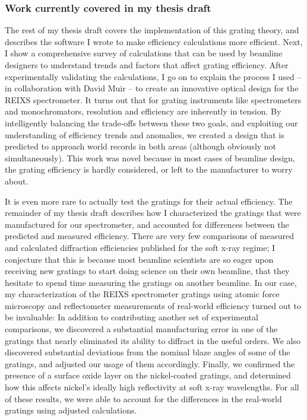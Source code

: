 \documentclass[singlespace,proposal]{uofsthesis-cs}
\begin{document}
\subsubsection{Work currently covered in my thesis draft}
The rest of my thesis draft covers the implementation of this grating theory, and describes the software I wrote to make efficiency calculations more efficient.  Next, I show a comprehensive survey of calculations that can be used by beamline designers to understand trends and factors that affect grating efficiency.  After experimentally validating the calculations, I go on to explain the process I used -- in collaboration with David Muir -- to create an innovative optical design for the REIXS spectrometer.  It turns out that for grating instruments like spectrometers and monochromators, resolution and efficiency are inherently in tension.  By intelligently balancing the trade-offs between these two goals, and exploiting our understanding of efficiency trends and anomalies, we created a design that is predicted to approach world records in both areas (although obviously not simultaneously).  This work was novel because in most cases of beamline design, the grating efficiency is hardly considered, or left to the manufacturer to worry about.

It is even more rare to actually test the gratings for their actual efficiency.  The remainder of my thesis draft describes how I characterized the gratings that were manufactured for our spectrometer, and accounted for differences between the predicted and measured efficiency.  There are very few comparisons of measured and calculated diffraction efficiencies published for the soft x-ray regime; I conjecture that this is because most beamline scientists are so eager upon receiving new gratings to start doing science on their own beamline, that they hesitate to spend time measuring the gratings on another beamline.  In our case, my characterization of the REIXS spectrometer gratings using atomic force microscopy and reflectometer measurements of real-world efficiency turned out to be invaluable: In addition to contributing another set of experimental comparisons, we discovered a substantial manufacturing error in one of the gratings that nearly eliminated its ability to diffract in the useful orders.  We also discovered substantial deviations from the nominal blaze angles of some of the gratings, and adjusted our usage of them accordingly.  Finally, we confirmed the presence of a surface oxide layer on the nickel-coated gratings, and determined how this affects nickel's ideally high reflectivity at soft x-ray wavelengths.  For all of these results, we were able to account for the differences in the real-world gratings using adjusted calculations.
\end{document}
